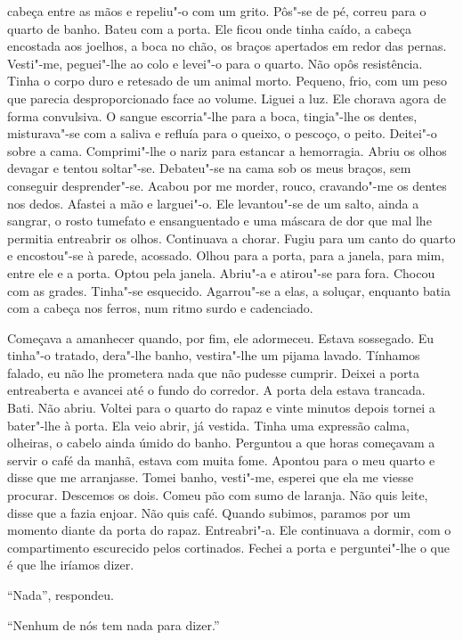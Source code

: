 cabeça entre as mãos e repeliu"-o com um grito. Pôs"-se de pé, correu
para o quarto de banho. Bateu com a porta. Ele ficou onde tinha caído, a
cabeça encostada aos joelhos, a boca no chão, os braços apertados em
redor das pernas. Vesti"-me, peguei"-lhe ao colo e levei"-o para o
quarto. Não opôs resistência. Tinha o corpo duro e retesado de um animal
morto. Pequeno, frio, com um peso que parecia desproporcionado face ao
volume. Liguei a luz. Ele chorava agora de forma convulsiva. O sangue
escorria"-lhe para a boca, tingia"-lhe os dentes, misturava"-se com a
saliva e refluía para o queixo, o pescoço, o peito. Deitei"-o sobre a
cama. Comprimi"-lhe o nariz para estancar a hemorragia. Abriu os olhos
devagar e tentou soltar"-se. Debateu"-se na cama sob os meus braços, sem
conseguir desprender"-se. Acabou por me morder, rouco, cravando"-me os
dentes nos dedos. Afastei a mão e larguei"-o. Ele levantou"-se de um
salto, ainda a sangrar, o rosto tumefato e ensanguentado e uma máscara
de dor que mal lhe permitia entreabrir os olhos. Continuava a chorar.
Fugiu para um canto do quarto e encostou"-se à parede, acossado. Olhou
para a porta, para a janela, para mim, entre ele e a porta. Optou pela
janela. Abriu"-a e atirou"-se para fora. Chocou com as grades. Tinha"-se
esquecido. Agarrou"-se a elas, a soluçar, enquanto batia com a cabeça
nos ferros, num ritmo surdo e cadenciado.

Começava a amanhecer quando, por fim, ele adormeceu. Estava sossegado.
Eu tinha"-o tratado, dera"-lhe banho, vestira"-lhe um pijama lavado.
Tínhamos falado, eu não lhe prometera nada que não pudesse cumprir.
Deixei a porta entreaberta e avancei até o fundo do corredor. A porta
dela estava trancada. Bati. Não abriu. Voltei para o quarto do rapaz e
vinte minutos depois tornei a bater"-lhe à porta. Ela veio abrir, já
vestida. Tinha uma expressão calma, olheiras, o cabelo ainda úmido do
banho. Perguntou a que horas começavam a servir o café da manhã,
estava com muita fome. Apontou para o meu quarto e disse que me
arranjasse. Tomei banho, vesti"-me, esperei que ela me viesse procurar.
Descemos os dois. Comeu pão com sumo de laranja. Não quis leite, disse
que a fazia enjoar. Não quis café. Quando subimos, paramos por um
momento diante da porta do rapaz. Entreabri"-a. Ele continuava a dormir,
com o compartimento escurecido pelos cortinados. Fechei a porta e
perguntei"-lhe o que é que lhe iríamos dizer.

``Nada'',
respondeu.

``Nenhum de nós tem nada para dizer.''

